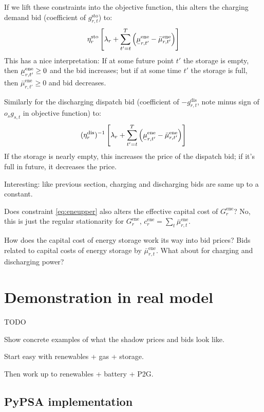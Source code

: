\documentclass[final,3p,times]{elsarticle}
\newcommand{\ubar}[1]{\text{\b{$#1$}}}
\def\l{\lambda}
\begin{document}
If we lift these constraints into the objective function, this alters the charging demand bid (coefficient of  $g^{\textrm{sto}}_{r,t}$) to:
\begin{equation}
   \eta^{\textrm{sto}}_r \left[ \l_r + \sum_{t'=t}^T \left( \ubar{\mu}^{\textrm{ene}}_{r,t'} -\bar{\mu}^{\textrm{ene}}_{r,t'}  \right) \right]
\end{equation}
This has a nice interpretation: If at some future point $t'$ the storage is empty, then $\ubar{\mu}^{\textrm{ene}}_{r,t'} \geq 0$  and the bid increases; but if at some time $t'$ the storage is full, then
$\bar{\mu}^{\textrm{ene}}_{r,t'} \geq 0$ and bid decreases.

Similarly for the discharging dispatch bid (coefficient of  $-g^{\textrm{dis}}_{r,t}$, note minus sign of $o_sg_{s,t}$ in objective function) to:
\begin{equation}
   (\eta^{\textrm{dis}}_r)^{-1}\left[ \l_r + \sum_{t'=t}^T \left(\ubar{\mu}^{\textrm{ene}}_{r,t'} - \bar{\mu}^{\textrm{ene}}_{r,t'}  \right)\right]
\end{equation}
If the storage is nearly empty, this increases the price of the dispatch bid; if it's full in future, it decreases the price.

Interesting: like previous section, charging and discharging bids are same up to a constant.

Does constraint \eqref{eq:eneupper} also alters the effective capital cost of $G^{\textrm{ene}}_r$? No, this is just the regular stationarity for $G^{\textrm{ene}}_r$, $ c^{\textrm{ene}}_r = \sum_t \bar{\mu}^{\textrm{ene}}_{r,t}$.

How does the capital cost of energy storage work its way into bid prices? Bids related to capital costs of energy storage by $\bar{\mu}^{\textrm{ene}}_{r,t}$. What about for charging and discharging power?


\section{Demonstration in real model}

TODO

Show concrete examples of what the shadow prices and bids look like.

Start easy with renewables + gas + storage.

Then work up to renewables + battery + P2G.


\subsection{PyPSA implementation}
\end{document}
